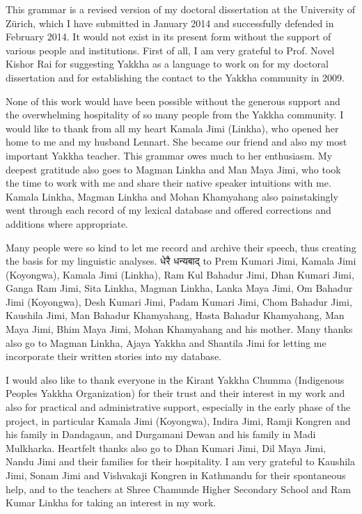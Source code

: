 This grammar is a revised version of my doctoral dissertation at the University of Zürich, which I have submitted in January 2014 and successfully defended in February 2014. It would not exist in its present form without the support of various people and institutions. First of all, I am very grateful to Prof. Novel Kishor Rai for suggesting Yakkha as a language to work on for my doctoral dissertation and for establishing the contact to the Yakkha community in 2009.

None of this work would have been possible without the generous support and the overwhelming hospitality of so many people from the Yakkha community. I would like to thank from all my heart Kamala  Jimi (Linkha), who opened her home to me and my husband Lennart. She became our friend and also my most important Yakkha teacher. This grammar owes much to her enthusiasm. My deepest gratitude also goes to Magman Linkha and Man Maya Jimi, who took the time to work with me and share their native speaker intuitions with me. Kamala Linkha, Magman Linkha and Mohan Khamyahang also painstakingly went through each record of my lexical database and offered corrections and additions where appropriate.

Many people were so kind to let me record and archive their speech, thus creating the basis for my linguistic analyses. {\footnotesize\Deva धेरै धन्यबाद्} to Prem Kumari Jimi, Kamala Jimi (Koyongwa), Kamala Jimi (Linkha), Ram Kul Bahadur Jimi, Dhan Kumari Jimi, Ganga Ram Jimi, Sita Linkha, Magman Linkha, Lanka Maya Jimi, Om Bahadur Jimi (Koyongwa), Desh Kumari Jimi, Padam Kumari Jimi, Chom Bahadur Jimi, Kaushila Jimi, Man Bahadur Khamyahang, Hasta Bahadur Khamyahang, Man Maya  Jimi, Bhim Maya  Jimi, Mohan Khamyahang and his mother. Many thanks also go to Magman Linkha, Ajaya Yakkha and Shantila Jimi for letting me incorporate their written stories into my database.

I would also like to thank everyone in the Kirant Yakkha Chumma (Indigenous Peoples Yakkha Organization) for their trust and their interest in my work and also for practical and administrative support, especially in the early phase of the project, in particular Kamala Jimi (Koyongwa), Indira Jimi, Ramji Kongren and his family in Dandagaun, and Durgamani Dewan and his family in Madi Mulkharka. Heartfelt thanks also go to Dhan Kumari Jimi, Dil Maya Jimi, Nandu Jimi and their families for their hospitality. I am very grateful to Kaushila Jimi, Sonam Jimi and Vishvakaji Kongren in Kathmandu for their spontaneous help, and to the teachers at Shree Chamunde Higher Secondary School and Ram Kumar Linkha for taking an interest in my work.

